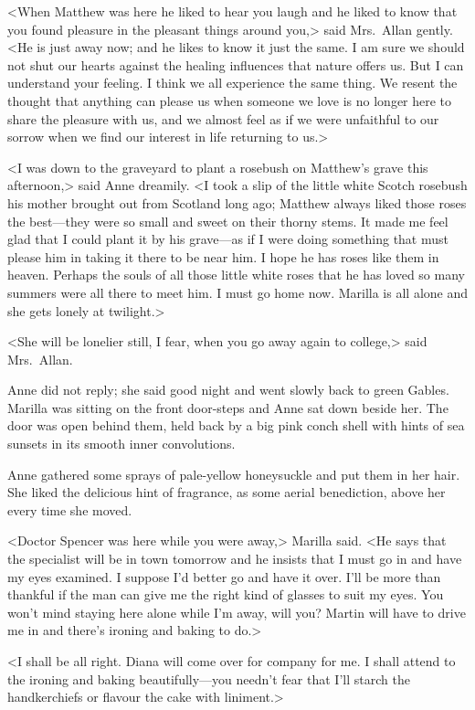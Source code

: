 <When Matthew was here he liked to hear you laugh and he liked to know that you found pleasure in the pleasant things around you,> said Mrs.~Allan gently. <He is just away now; and he likes to know it just the same. I am sure we should not shut our hearts against the healing influences that nature offers us. But I can understand your feeling. I think we all experience the same thing. We resent the thought that anything can please us when someone we love is no longer here to share the pleasure with us, and we almost feel as if we were unfaithful to our sorrow when we find our interest in life returning to us.>

<I was down to the graveyard to plant a rosebush on Matthew's grave this afternoon,> said Anne dreamily. <I took a slip of the little white Scotch rosebush his mother brought out from Scotland long ago; Matthew always liked those roses the best—they were so small and sweet on their thorny stems. It made me feel glad that I could plant it by his grave—as if I were doing something that must please him in taking it there to be near him. I hope he has roses like them in heaven. Perhaps the souls of all those little white roses that he has loved so many summers were all there to meet him. I must go home now. Marilla is all alone and she gets lonely at twilight.>

<She will be lonelier still, I fear, when you go away again to college,> said Mrs.~Allan.

Anne did not reply; she said good night and went slowly back to green Gables. Marilla was sitting on the front door-steps and Anne sat down beside her. The door was open behind them, held back by a big pink conch shell with hints of sea sunsets in its smooth inner convolutions.

Anne gathered some sprays of pale-yellow honeysuckle and put them in her hair. She liked the delicious hint of fragrance, as some aerial benediction, above her every time she moved.

<Doctor Spencer was here while you were away,> Marilla said. <He says that the specialist will be in town tomorrow and he insists that I must go in and have my eyes examined. I suppose I'd better go and have it over. I'll be more than thankful if the man can give me the right kind of glasses to suit my eyes. You won't mind staying here alone while I'm away, will you? Martin will have to drive me in and there's ironing and baking to do.>

<I shall be all right. Diana will come over for company for me. I shall attend to the ironing and baking beautifully—you needn't fear that I'll starch the handkerchiefs or flavour the cake with liniment.>

